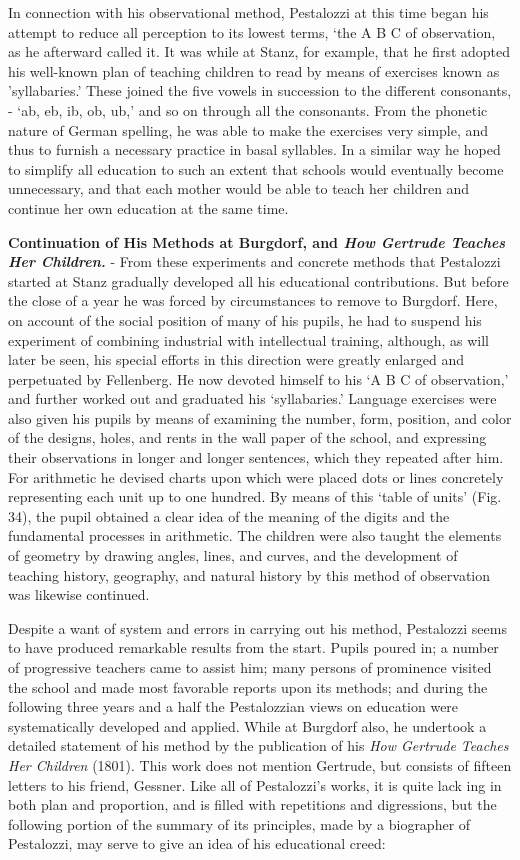 \documentclass[]{book}
\begin{document}
In connection with his observational method, Pestalozzi at this time began his attempt to reduce all perception to its lowest terms, `the A B C of observation, as he afterward called it. It was while at Stanz, for example, that he first adopted his well-known plan of teaching children to read by means of exercises known as 'syllabaries.' These joined the five vowels in succession to the different consonants, - `ab, eb, ib, ob, ub,' and so on through all the consonants. From the phonetic nature of German spelling, he was able to make the exercises very simple, and thus to furnish a necessary practice in basal syllables. In a similar way he hoped to simplify all education to such an extent that schools would eventually become unnecessary, and that each mother would be able to teach her children and continue her own education at the same time.

\textbf{Continuation of His Methods at Burgdorf, and \emph{How Gertrude Teaches Her Children.}} - From these experiments and concrete methods that Pestalozzi started at Stanz gradually developed all his educational contributions. But before the close of a year he was forced by circumstances to remove to Burgdorf. Here, on account of the social position of many of his pupils, he had to suspend his experiment of combining industrial with intellectual training, although, as will later be seen, his special efforts in this direction were greatly enlarged and perpetuated by Fellenberg. He now devoted himself to his `A B C of observation,' and further worked out and graduated his `syllabaries.' Language exercises were also given his pupils by means of examining the number, form, position, and color of the designs, holes, and rents in the wall paper of the school, and expressing their observations in longer and longer sentences, which they repeated after him. For arithmetic he devised charts upon which were placed dots or lines concretely representing each unit up to one hundred. By means of this `table of units' (Fig. 34), the pupil obtained a clear idea of the meaning of the digits and the fundamental processes in arithmetic. The children were also taught the elements of geometry by drawing angles, lines, and curves, and the development of teaching history, geography, and natural history by this method of observation was likewise continued.

Despite a want of system and errors in carrying out his method, Pestalozzi seems to have produced remarkable results from the start. Pupils poured in; a number of progressive teachers came to assist him; many persons of prominence visited the school and made most favorable reports upon its methods; and during the following three years and a half the Pestalozzian views on education were systematically developed and applied. While at Burgdorf also, he undertook a detailed statement of his method by the publication of his \emph{How Gertrude Teaches Her Children} (1801). This work does not mention Gertrude, but consists of fifteen letters to his friend, Gessner. Like all of Pestalozzi's works, it is quite lack ing in both plan and proportion, and is filled with repetitions and digressions, but the following portion of the summary of its principles, made by a biographer of Pestalozzi, may serve to give an idea of his educational creed:
\end{document}
